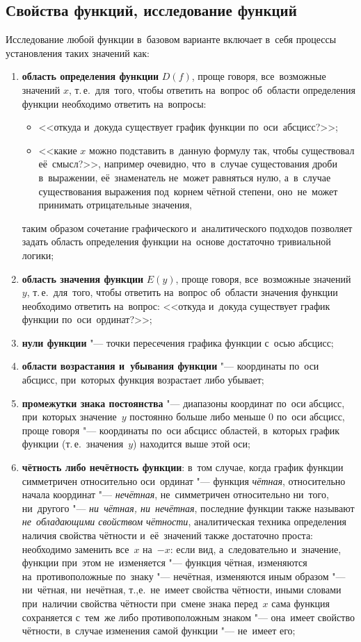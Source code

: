 \documentclass[]{scrartcl}
\begin{document}
\subsection{Свойства функций, исследование функций}
Исследование любой функции в~базовом варианте включает в~себя процессы установления таких значений как:
\begin{enumerate}
	\item \textbf{область определения функции} ${\textstyle D(f)}$, проще говоря, все~возможные значений ${\textstyle x}$, т.\,е.~для~того, чтобы ответить на~вопрос об~области определения функции необходимо ответить на~вопросы:
	\begin{itemize}
		\item  <<откуда и~докуда существует график функции по~оси~абсцисс?>>;
		\item <<какие ${\textstyle x}$ можно подставить в~данную формулу так, чтобы существовал её~смысл?>>, например очевидно, что~в~случае сущестования дроби в~выражении, её~знаменатель не~может равняться нулю, а~в~случае существования выражения под~корнем чётной степени, оно~не~может принимать отрицательные значения,
	\end{itemize}
	таким образом сочетание графического и~аналитического подходов позволяет задать область определения функции на~основе достаточно тривиальной логики;
	\item \textbf{область значения функции} ${\textstyle E(y)}$, проще говоря, все~возможные значений ${\textstyle y}$, т.\,е.~для~того, чтобы ответить на~вопрос об~области значения функции необходимо ответить на~вопрос: <<откуда и~докуда существует график функции по~оси~ординат?>>;
	\item \textbf{нули функции} "--- точки пересечения графика функции с~осью абсцисс;
	\item \textbf{области возрастания и~убывания функции} "--- координаты по~оси абсцисс, при~которых функция возрастает либо убывает;
	\item \textbf{промежутки знака постоянства} "--- диапазоны координат по~оси абсцисс, при~которых значение~${\textstyle y}$ постоянно больше либо меньше ${\textstyle 0}$ по~оси абсцисс, проще говоря "--- координаты по~оси абсцисс областей, в~которых график функции (т.\,е.~значения~${\textstyle y}$) находится выше этой оси;
	\item \textbf{чётность либо нечётность функции}: в~том случае, когда график функции симметричен относительно оси~ординат "--- функция \emph{чётная}, относительно начала координат "--- \emph{нечётная}, не~симметричен относительно ни~того, ни~другого "--- \emph{ни~чётная, ни~нечётная}, последние функции также называют \emph{не~обладающими свойством чётности}, аналитическая техника определения наличия свойства чётности и~её~значений также достаточно проста: необходимо заменить все~${\textstyle x}$ на~${\textstyle -x}$: если вид, а~следовательно и~значение, функции при~этом не~изменяется "--- функция чётная, изменяются на~противоположные по~знаку "--- нечётная, изменяются иным образом "--- ни~чётная, ни~нечётная, т.,е.~не~имеет свойства чётности, иными словами при~наличии свойства чётности при~смене знака перед~${\textstyle x}$ сама функция сохраняется с~тем~же либо противоположным знаком "--- она~имеет свойство чётности, в~случае изменения самой функции "--- не~имеет его;

\end{enumerate}
\end{document}
